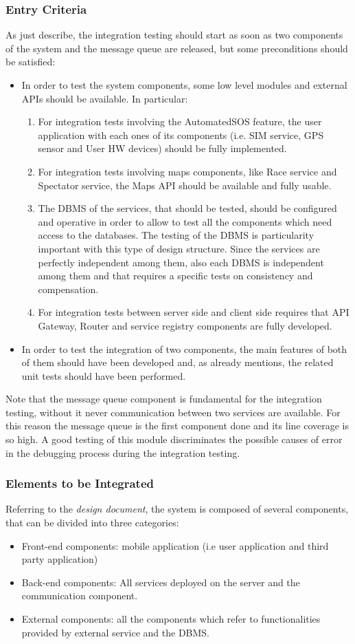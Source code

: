 \subsubsection{Entry Criteria}
As just describe, the integration testing should start as soon as two components of the system and the message queue are released, but some preconditions should be satisfied:
\begin{itemize}
\item In order to test the system components, some low level modules and external APIs should be available. In particular: 
\begin{enumerate}
\item For integration tests involving the AutomatedSOS feature, the user application with each ones of its components (i.e. SIM service, GPS sensor and User HW devices) should be fully implemented.
\item For integration tests involving maps components, like Race service and Spectator service, the Maps API should be available and fully usable.
\item The DBMS of the services, that should be tested, should be configured and operative in order to allow to test all the components which need access to the databases. The testing of the DBMS is particularity important with this type of design structure. Since the services are perfectly independent among them, also each DBMS is independent among them and that requires a specific tests on consistency and compensation.
\item For integration tests between server side and client side requires that API Gateway, Router and service registry components are fully developed.
\end{enumerate}
\item In order to test the integration of two components, the main features of both of them should have been developed and, as already mentions, the related unit tests should have been performed.
\end{itemize}
Note that the message queue component is fundamental for the integration testing, without it never communication between two services are available. For this reason the message queue is the first component done and its line coverage is so high. A good testing of this module discriminates the possible causes of error in the debugging process during the integration testing.  
\subsubsection{Elements to be Integrated}
Referring to the \textit{design document}, the system is composed of several components, that can be divided into three categories: 
\begin{itemize}
\item Front-end components: mobile application (i.e user application and third party application)
\item Back-end components: All services deployed on the server and the communication component.
\item External components: all the components which refer to functionalities provided by external service and the DBMS.
\end{itemize}
